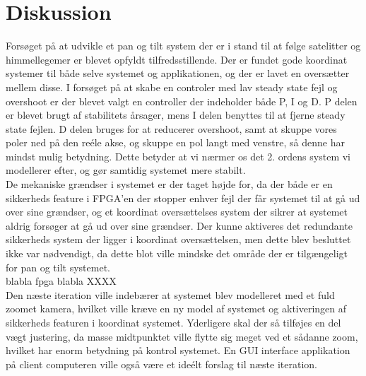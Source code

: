 \section{Diskussion}

Forsøget på at udvikle et pan og tilt system der er i stand til at følge satelitter og himmellegemer er blevet opfyldt tilfredsstillende. Der er fundet gode koordinat systemer til både selve systemet og applikationen, og der er lavet en oversætter mellem disse. I forsøget på at skabe en controler med lav steady state fejl og overshoot er der blevet valgt en controller der indeholder både P, I og D. P delen er blevet brugt af stabilitets årsager, mens I delen benyttes til at fjerne steady state fejlen. D delen bruges for at reducerer overshoot, samt at skuppe vores poler ned på den reéle akse, og skuppe en pol langt med venstre, så denne har mindst mulig betydning. Dette betyder at vi nærmer os det 2. ordens system vi modellerer efter, og gør samtidig systemet mere stabilt.
\\
De mekaniske grændser i systemet er der taget højde for, da der både er en sikkerheds feature i FPGA'en der stopper enhver fejl der får systemet til at gå ud over sine grændser, og et koordinat oversættelses system der sikrer at systemet aldrig forsøger at gå ud over sine grændser. Der kunne aktiveres det redundante sikkerheds system der ligger i koordinat oversættelsen, men dette blev besluttet ikke var nødvendigt, da dette blot ville mindske det område der er tilgængeligt for pan og tilt systemet.
\\
blabla fpga blabla XXXX
\\
Den næste iteration ville indebærer at systemet blev modelleret med et fuld zoomet kamera, hvilket ville kræve en ny model af systemet og aktiveringen af sikkerheds featuren i koordinat systemet. Yderligere skal der så tilføjes en del vægt justering, da masse midtpunktet ville flytte sig meget ved et sådanne zoom, hvilket har enorm betydning på kontrol systemet. En GUI interface applikation på client computeren ville også være et ideélt forslag til næste iteration.





